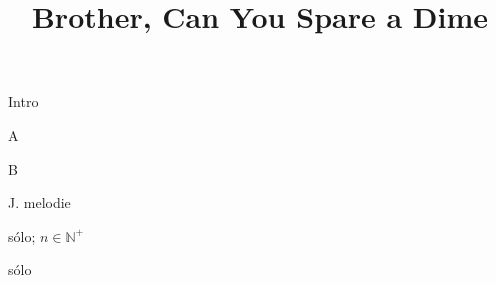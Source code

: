 \documentclass[timestamp]{jazzgrid}
\title{Brother, Can You Spare a Dime}
\begin{document}
\maketitle
\begin{musicsection}{Intro}
\barline
	{\barfour{}
		{}
		{}
		{}
		{}
	}
	{\barfour{}
		{}
		{}
		{}
		{}
	}
	{\barfour{}
		{}
		{}
		{}
		{}
	}
	{\barfour{}
		{}
		{}
		{}
		{}
	}
\barline
	{\barfour{}
		{}
		{}
		{}
		{}
	}
	{\barfour{}
		{}
		{}
		{}
		{}
	}
	{\barfour{}
		{}
		{}
		{}
		{}
	}
	{\barfour{}
		{}
		{}
		{}
		{}
	}
\barline
	{\barfour{}
		{}
		{}
		{}
		{}
	}
	{\barfour{}
		{}
		{}
		{}
		{}
	}
	{\barfour{}
		{}
		{}
		{}
		{}
	}
	{\barfour{}
		{}
		{}
		{}
		{}
	}
\barline
	{\barfour{}
		{}
		{}
		{}
		{}
	}
	{\barfour{}
		{}
		{}
		{}
		{}
	}
	{\barfour{}
		{}
		{}
		{}
		{}
	}
	{\barfour{}
		{}
		{}
		{}
		{}
	}
\end{musicsection}
\begin{musicsection}{A}
\barline
	{\barfour{}
		{}
		{}
		{}
		{}
	}
	{\barfour{}
		{}
		{}
		{}
		{}
	}
	{\barfour{}
		{}
		{}
		{}
		{}
	}
	{\barfour{}
		{}
		{}
		{}
		{}
	}
\barline
	{\barfour{}
		{}
		{}
		{}
		{}
	}
	{\barfour{}
		{}
		{}
		{}
		{}
	}
	{\barfour{}
		{}
		{}
		{}
		{}
	}
	{
		{}
		{}
		{}
		{}
	}
	{
		{}
		{}
		{}
		{}
	}
\end{musicsection}
\begin{musicsection}{B}
\barline
	{\barfour{}
		{}
		{}
		{}
		{}
	}
	{\barfour{}
		{}
		{}
		{}
		{}
	}
	{\barfour{}
		{}
		{}
		{}
		{}
	}
	{\barfour{}
		{}
		{}
		{}
		{}
	}
\barline
	{\barfour{}
		{}
		{}
		{}
		{}
	}
	{\barfour{}
		{}
		{}
		{}
		{}
	}
	{\barfour{}
		{}
		{}
		{}
		{}
	}
	{\barfour{}
		{}
		{}
		{}
		{}
	}
\end{musicsection}
\begin{multicols*}{2}
\scriptsize
\begin{description}[noitemsep,align=right,labelwidth=\widthof{\bfseries{AABABA}}]
	\item [Intro]
	\item [AABABA] J. melodie
	\item [{$[$AA$]_n$}] sólo; $n \in \mathbb{N}^+$
	\item [BA] sólo
\end{description}
\end{multicols*}
\end{document}
